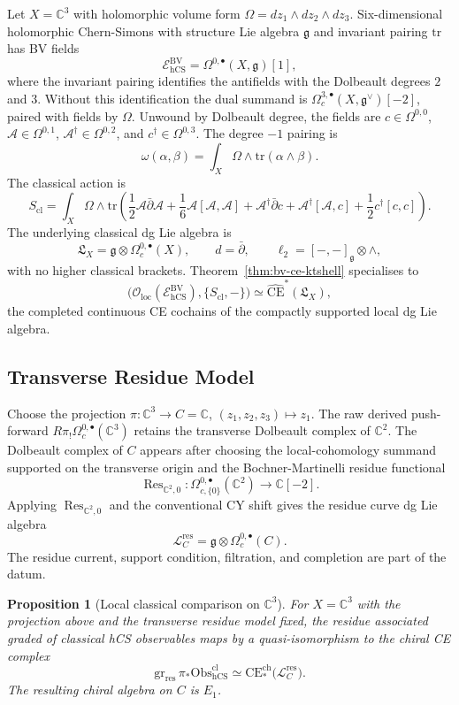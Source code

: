 \documentclass[11pt]{amsart}
\providecommand{\C}{\mathbb{C}}
\providecommand{\dbar}{\bar{\partial}}
\providecommand{\gfrak}{\mathfrak{g}}
\providecommand{\Lfrak}{\mathfrak{L}}
\providecommand{\tr}{\mathrm{tr}}
\providecommand{\BV}{\mathrm{BV}}
\providecommand{\CE}{\mathrm{CE}}
\providecommand{\chCE}{\mathrm{CE}^{\mathrm{ch}}}
\providecommand{\hCS}{\mathrm{hCS}}
\providecommand{\cA}{\mathcal{A}}
\providecommand{\cE}{\mathcal{E}}
\providecommand{\cL}{\mathcal{L}}
\providecommand{\cO}{\mathcal{O}}
\providecommand{\Obs}{\mathrm{Obs}}
\theoremstyle{plain}
\newtheorem{proposition}[theorem]{Proposition}
\theoremstyle{definition}
\theoremstyle{remark}
\begin{document}
Let $X=\C^3$ with holomorphic volume form
$\Omega=dz_1\wedge dz_2\wedge dz_3$.  Six-dimensional holomorphic
Chern-Simons with structure Lie algebra $\gfrak$ and invariant
pairing $\tr$ has BV fields
\[
  \cE^\BV_{\hCS}
  =
  \Omega^{0,\bullet}(X,\gfrak)[1],
\]
where the invariant pairing identifies the antifields with the
Dolbeault degrees \(2\) and \(3\).  Without this identification the
dual summand is \(\Omega^{3,\bullet}_c(X,\gfrak^\vee)[-2]\), paired
with fields by \(\Omega\).
Unwound by Dolbeault degree, the fields are
$c\in\Omega^{0,0}$, $\cA\in\Omega^{0,1}$,
$\cA^\dagger\in\Omega^{0,2}$, and
$c^\dagger\in\Omega^{0,3}$.  The degree $-1$ pairing is
\[
  \omega(\alpha,\beta)
  =
  \int_X\Omega\wedge\tr(\alpha\wedge\beta).
\]
The classical action is
\[
  S_{\mathrm{cl}}
  =
  \int_X\Omega\wedge\tr\!\left(
  \frac{1}{2}\cA\dbar\cA
  +\frac{1}{6}\cA[\cA,\cA]
  +\cA^\dagger\dbar c
  +\cA^\dagger[\cA,c]
  +\frac{1}{2}c^\dagger[c,c]
  \right).
\]
The underlying classical dg Lie algebra is
\[
  \Lfrak_X
  =
  \gfrak\otimes\Omega^{0,\bullet}_c(X),
  \qquad
  d=\dbar,
  \qquad
  \ell_2=[-,-]_{\gfrak}\otimes\wedge ,
\]
with no higher classical brackets.  Theorem~\ref{thm:bv-ce-ktshell}
specialises to
\[
  \bigl(\cO_{\mathrm{loc}}(\cE^\BV_{\hCS}),\{S_{\mathrm{cl}},-\}\bigr)
  \simeq
  \widehat{\CE}^*(\Lfrak_X),
\]
the completed continuous CE cochains of the compactly supported local
dg Lie algebra.

\subsection{Transverse Residue Model}

Choose the projection
$\pi:\C^3\to C=\C$, $(z_1,z_2,z_3)\mapsto z_1$.  The raw derived
push-forward \(R\pi_!\Omega^{0,\bullet}_c(\C^3)\) retains the
transverse Dolbeault complex of \(\C^2\).  The Dolbeault complex of
\(C\) appears after
choosing the local-cohomology summand supported on the transverse
origin and the Bochner-Martinelli residue functional
\[
  \operatorname{Res}_{\C^2,0}:
  \Omega^{0,\bullet}_{c,\{0\}}(\C^2)
  \longrightarrow
  \C[-2].
\]
Applying \(\operatorname{Res}_{\C^2,0}\) and the conventional CY shift
gives the residue curve dg Lie algebra
\[
  \cL_C^{\mathrm{res}}
  =
  \gfrak\otimes\Omega^{0,\bullet}_c(C).
\]
The residue current, support condition, filtration, and completion are
part of the datum.

\begin{proposition}[Local classical comparison on \texorpdfstring{$\C^3$}{C3}]
\label{prop:c3-classical-comparison}
For $X=\C^3$ with the projection above and the transverse residue model
fixed, the residue associated graded of classical hCS observables maps
by a quasi-isomorphism to the chiral CE complex
\[
  \mathrm{gr}_{\mathrm{res}}\,\pi_*\Obs_{\hCS}^{\mathrm{cl}}
  \simeq
  \chCE_*\bigl(\cL_C^{\mathrm{res}}\bigr).
\]
The resulting chiral algebra on $C$ is $E_1$.
\end{proposition}
\end{document}
